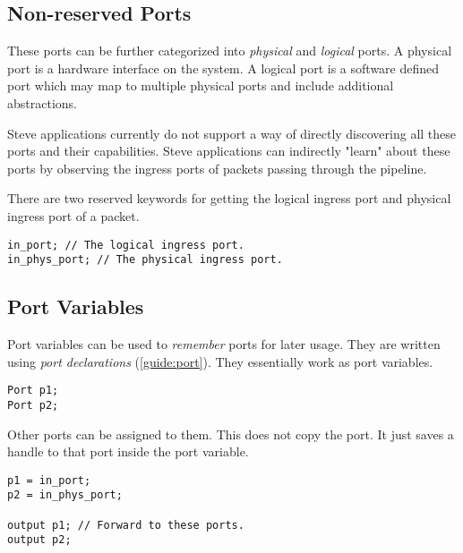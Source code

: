 \subsection{Non-reserved Ports} \label{tut:regular_ports}

These ports can be further categorized into \textit{physical} and
\textit{logical} ports. A physical port is a hardware interface on the system. A
logical port is a software defined port which may map to multiple physical ports
and include additional abstractions.

Steve applications currently do not support a way of directly discovering all
these ports and their capabilities. Steve applications can indirectly "learn"
about these ports by observing the ingress ports of packets passing
through the pipeline.

There are two reserved keywords for getting the logical ingress port and physical ingress port of a packet.

\begin{codepage}
\begin{lstlisting}
in_port; // The logical ingress port.
in_phys_port; // The physical ingress port.
\end{lstlisting}
\end{codepage}

\subsection{Port Variables} \label{tut:declared_ports}

Port variables can be used to \textit{remember} ports for later usage. They are
written using \textit{port declarations} (\ref{guide:port}).
They essentially work as port variables.

\begin{codepage}
\begin{lstlisting}
Port p1;
Port p2;
\end{lstlisting}
\end{codepage}

Other ports can be assigned to them. This does not copy the port. It just saves
a handle to that port inside the port variable.

\begin{codepage}
\begin{lstlisting}
p1 = in_port; 
p2 = in_phys_port;

output p1; // Forward to these ports.
output p2;
\end{lstlisting}
\end{codepage}

